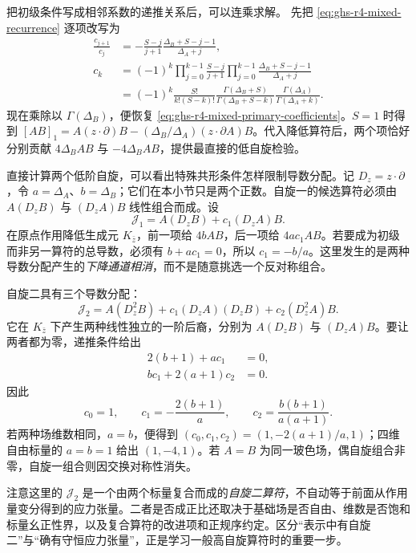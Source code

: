 把初级条件写成相邻系数的递推关系后，可以连乘求解。
先把 \cref{eq:ghs-r4-mixed-recurrence} 逐项改写为
\begin{align*}
 \frac{c_{j+1}}{c_j}
 &=-\frac{S-j}{j+1}\frac{\Delta_B+S-j-1}{\Delta_A+j},\\
 c_k&=(-1)^k\prod_{j=0}^{k-1}\frac{S-j}{j+1}
 \prod_{j=0}^{k-1}\frac{\Delta_B+S-j-1}{\Delta_A+j}\\
 &=(-1)^k\frac{S!}{k!(S-k)!}
 \frac{\Gamma(\Delta_B+S)}{\Gamma(\Delta_B+S-k)}
 \frac{\Gamma(\Delta_A)}{\Gamma(\Delta_A+k)}.
\end{align*}
现在乘除以 $\Gamma(\Delta_B)$，便恢复 \cref{eq:ghs-r4-mixed-primary-coefficients}。$S=1$ 时得到 $[AB]_1= A(z\cdot\partial)B-(\Delta_B/\Delta_A)(z\cdot\partial A)B$。代入降低算符后，两个项恰好分别贡献 $4\Delta_B AB$ 与 $-4\Delta_B AB$，提供最直接的低自旋检验。


\begin{example}[混合标量的自旋一与自旋二初级算符]
直接计算两个低阶自旋，可以看出特殊共形条件怎样限制导数分配。记 $D_z=z\cdot\partial$，令 $a=\Delta_A$、$b=\Delta_B$；它们在本小节只是两个正数。自旋一的候选算符必须由 $A(D_zB)$ 与 $(D_zA)B$ 线性组合而成。设
\[
 \mathcal J_1=A(D_zB)+c_1(D_zA)B.
\]
在原点作用降低生成元 $K_{\bar z}$，前一项给 $4bAB$，后一项给 $4ac_1AB$。若要成为初级而非另一算符的总导数，必须有 $b+ac_1=0$，所以 $c_1=-b/a$。这里发生的是两种导数分配产生的\emph{下降通道相消}，而不是随意挑选一个反对称组合。

自旋二具有三个导数分配：
\[
 \mathcal J_2=A(D_z^2B)+c_1(D_zA)(D_zB)+c_2(D_z^2A)B.
\]
它在 $K_{\bar z}$ 下产生两种线性独立的一阶后裔，分别为 $A(D_zB)$ 与 $(D_zA)B$。要让两者都为零，递推条件给出
\begin{align*}
 2(b+1)+ac_1&=0,\\
 bc_1+2(a+1)c_2&=0.
\end{align*}
因此
\begin{equation}\label{eq:ghs-bridge-spin-two-coeffs}
 c_0=1,\qquad c_1=-\frac{2(b+1)}{a},\qquad
 c_2=\frac{b(b+1)}{a(a+1)}.
\end{equation}
若两种场维数相同，$a=b$，便得到 $(c_0,c_1,c_2)=(1,-2(a+1)/a,1)$；四维自由标量的 $a=b=1$ 给出 $(1,-4,1)$。若 $A=B$ 为同一玻色场，偶自旋组合非零，自旋一组合则因交换对称性消失。

注意这里的 $\mathcal J_2$ 是一个由两个标量复合而成的\emph{自旋二算符}，不自动等于前面从作用量变分得到的应力张量。二者是否成正比还取决于基础场是否自由、维数是否饱和标量幺正性界，以及复合算符的改进项和正规序约定。区分“表示中有自旋二”与“确有守恒应力张量”，正是学习一般高自旋算符时的重要一步。


\end{example}

